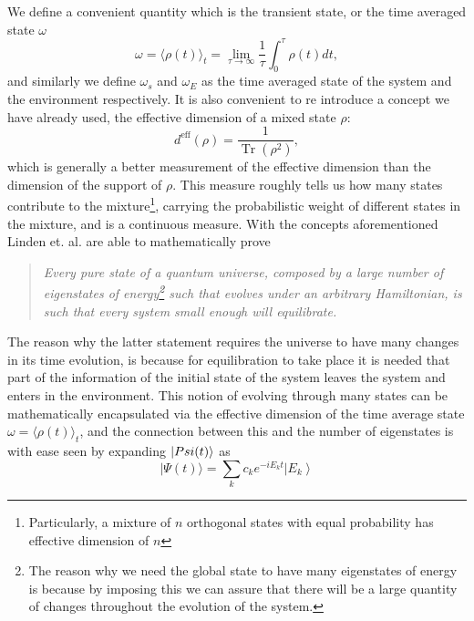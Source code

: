 We define a convenient quantity which is the transient state, or the time averaged state $\omega$
\begin{equation}
\omega=\langle\rho(t)\rangle_{t}=\lim _{\tau \rightarrow \infty} \frac{1}{\tau} \int_{0}^{\tau} \rho(t) d t,
\label{CH1:average_time_state}
\end{equation}
and similarly we define $\omega_s$ and $\omega_E$ as the time averaged state of the system and the environment respectively.\newline
It is also convenient to re introduce a concept we have already used, the effective dimension of a mixed state $\rho$:
\begin{equation}
d^{\mathrm{eff}}(\rho)=\frac{1}{\operatorname{Tr}\left(\rho^{2}\right)},
\label{CH1:Effective_dimension}
\end{equation}
which is generally a better measurement of the effective dimension than the dimension of the support of $\rho$. This measure roughly tells us how many states contribute to the mixture\footnote{Particularly, a mixture of $n$ orthogonal states with equal probability has effective dimension of $n$ }, carrying the probabilistic weight of different states in the mixture, and is a continuous measure.
\newline
With the concepts aforementioned Linden et. al. \cite{linden_quantum_2009} are able to mathematically prove
\begin{quote}
\textit{Every pure state of a quantum universe, composed by a large number of eigenstates of energy\footnote{The reason why we need the global state to have many eigenstates of energy is because by imposing this we can assure that there will be a large quantity of changes throughout the evolution of the system.} such that evolves under an arbitrary Hamiltonian, is such that every system small enough will equilibrate.}
\end{quote}
The reason why the latter statement requires the universe to have many changes in its time evolution, is because for equilibration to take place it is needed that part of the information of the initial state of the system leaves the system and enters in the environment. This notion of evolving through many states can be mathematically encapsulated via the effective dimension of the time average state $\omega=\langle\rho(t)\rangle_{t}$, and the connection between this and the number of eigenstates is with ease seen by expanding $\mathinner{|{Psi(t)}\rangle}$ as
\begin{equation}
|\Psi(t)\rangle=\sum_{k} c_{k} e^{-i E_{k} t}\left|E_{k}\right\rangle
\label{CH1:expansion_1}
\end{equation}
